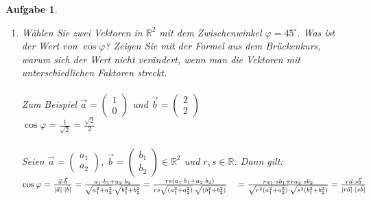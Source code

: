 \documentclass[12pt]{article}
\newtheorem{exercise}[satz]{Aufgabe}
\begin{document}
\begin{exercise}
\begin{enumerate}
\begin{enumerate}
                    $\varphi$ ist gleich dem Winkel zwischen $\vec{a}$ und $\frac{1}{4}\vec{d}$\\
                    $\vec{a}\cdot\frac{1}{4}\vec{d}=-1, \,\vert\vec{a}\vert=\sqrt{10}, \, \vert\frac{1}{4}\vec{d}\vert=\sqrt{5} \\ 
                   \Rightarrow \cos{\varphi}=\frac{-1}{\sqrt{50}}=\frac{-1}{5\sqrt{2}} \Leftrightarrow \varphi = 98,13^\circ$
        \end{enumerate}
    \item[(c)] W\"ahlen Sie zwei Vektoren in $\mathbb{R}^2$ mit dem Zwischenwinkel $\varphi=45^\circ$. Was ist der Wert von $\cos{\varphi}$? Zeigen Sie mit der Formel aus dem Br\"uckenkurs, warum sich der Wert nicht  ver\"andert, wenn man die Vektoren mit unterschiedlichen Faktoren streckt. \\ \\
        Zum Beispiel $\vec{a}=\left(\begin{array}{r} 1 \\ 0 \end{array}\right)$ und
          $\vec{b}=\left(\begin{array}{r} 2 \\ 2 \end{array}\right)$\, \\
          $\cos{\varphi}=\frac{1}{\sqrt{2}}=\frac{\sqrt{2}}{2}$ \\ \\
          Seien $\vec{a}=\left(\begin{array}{r} a_1 \\ a_2 \end{array}\right)$,
          $\vec{b}=\left(\begin{array}{r} b_1 \\ b_2 \end{array}\right) \in \mathbb{R}^2$
          und $r,s \in \mathbb{R}$. Dann gilt:
          $\cos{\varphi}=\frac{\vec{a}\cdot\vec{b}}{\vert\vec{a}\vert \cdot \vert\vec{b}\vert}=
          \frac{a_1\cdot b_1+a_2\cdot b_2}{\sqrt{a_1^2+a_2^2}\cdot\sqrt{b_1^2+b_2^2}}
          = \frac{rs(a_1\cdot b_1+a_2\cdot b_2)}{rs\sqrt{(a_1^2+a_2^2)}\cdot\sqrt{(b_1^2+b_2^2)}}\\
          \quad=\frac{ra_1\cdot sb_1+ra_2\cdot sb_2}{\sqrt{r^2(a_1^2+a_2^2)}\cdot\sqrt{s^2(b_1^2+b_2^2)}}
          =\frac{r\vec{a}\cdot s\vec{b}}{\vert r \vec{a}\vert \cdot \vert s\vec{b}\vert}$
  \end{enumerate}
\end{exercise}
\end{document}
